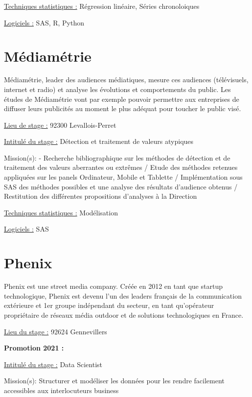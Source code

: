 \documentclass[
  letterpaper,
  DIV=11,
  numbers=noendperiod]{scrreprt}
\begin{document}
\uline{Techniques statistiques :} Régression linéaire, Séries
chronoloiques

\uline{Logiciels :} SAS, R, Python

\hypertarget{muxe9diamuxe9trie}{%
\section{\texorpdfstring{\textbf{Médiamétrie}}{Médiamétrie}}\label{muxe9diamuxe9trie}}

Médiamétrie, leader des audiences médiatiques, mesure ces audiences
(télévisuels, internet et radio) et analyse les évolutions et
comportements du public. Les études de Médiamétrie vont par exemple
pouvoir permettre aux entreprises de diffuser leurs publicités au moment
le plus adéquat pour toucher le public visé.

\uline{Lieu de stage :} 92300 Levallois-Perret

\uline{Intitulé du stage :} Détection et traitement de valeurs atypiques

Mission(s): - Recherche bibliographique sur les méthodes de détection et
de traitement des valeurs aberrantes ou extrêmes / Etude des méthodes
retenues appliquées sur les panels Ordinateur, Mobile et Tablette /
Implémentation sous SAS des méthodes possibles et une analyse des
résultats d'audience obtenus / Restitution des différentes propositions
d'analyses à la Direction

\uline{Techniques statistiques :} Modélisation

\uline{Logiciels :} SAS

\hypertarget{phenix}{%
\section{\texorpdfstring{\textbf{Phenix}}{Phenix}}\label{phenix}}

Phenix est une street media company. Créée en 2012 en tant que startup
technologique, Phenix est devenu l'un des leaders français de la
communication extérieure et 1er groupe indépendant du secteur, en tant
qu'opérateur propriétaire de réseaux média outdoor et de solutions
technologiques en France.

\uline{Lieu du stage :} 92624 Gennevillers

\textbf{Promotion 2021 :}

\uline{Intitulé du stage :} Data Scientist

Mission(s): Structurer et modéliser les données pour les rendre
facilement accessibles aux interlocuteurs business
\end{document}
